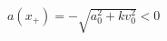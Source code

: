 \documentclass[border=2.5pt]{standalone}
\begin{document}
$\displaystyle a(x_+)=-\sqrt{a_0^2+kv_0^2}<0$
\end{document}
